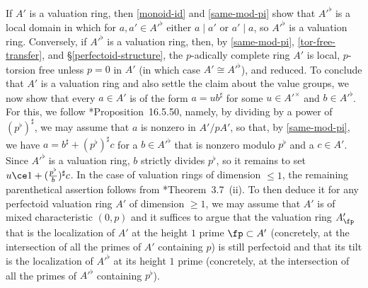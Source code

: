 If $A'$ is a valuation ring, then \eqref{monoid-id} and \eqref{same-mod-pi} show that $A'^\flat$ is a local domain in which for $a, a' \in A'^\flat$ either $a \mid a'$ or $a' \mid a$, so  $A'^\flat$ is a valuation ring. Conversely, if $A'^\flat$ is a valuation ring, then, by \eqref{same-mod-pi}, \eqref{tor-free-transfer}, and \S\ref{perfectoid-structure}, the $p$-adically complete ring $A'$ is local, $p$-torsion free unless $p = 0$ in $A'$ (in which case $A' \cong A'^\flat$), and reduced. To conclude that $A'$ is a valuation ring and also settle the claim about the value groups, we now show that every $a \in A'$ is of the form $a = ub^\sharp$ for some $u \in A'^\times$ and $b \in A'^\flat$. For this, we follow \cite{GR18}*{Proposition~16.5.50}, namely, by dividing by a power of $(p^\flat)^\sharp$, we may assume that $a$ is nonzero in $A'/pA'$, so that, by \eqref{same-mod-pi}, we have $a = b^\sharp + (p^\flat)^\sharp c$ for a $b \in A'^\flat$ that is nonzero modulo $p^\flat$ and a $c \in A'$. Since $A'^\flat$ is a valuation ring, $b$ strictly divides $p^\flat$, so it remains to set $u \ce 1 + (\frac{p^\flat}b)^\sharp c$. In the case of valuation rings of dimension $\le 1$, the remaining parenthetical assertion follows from \cite{Sch12}*{Theorem~3.7~(ii)}. %
To then deduce it for any perfectoid valuation ring $A'$ of dimension $\ge 1$, we may assume that $A'$ is of mixed characteristic $(0, p)$ and it suffices to argue that the valuation ring $A'_\fp$ that is the localization of $A'$ at the height $1$ prime $\fp \subset A'$ (concretely, at the intersection of all the primes of $A'$ containing $p$) is still perfectoid and that its tilt is the localization of $A'^\flat$ at its height $1$ prime (concretely, at the intersection of all the primes of $A'^\flat$ containing $p^\flat$).

